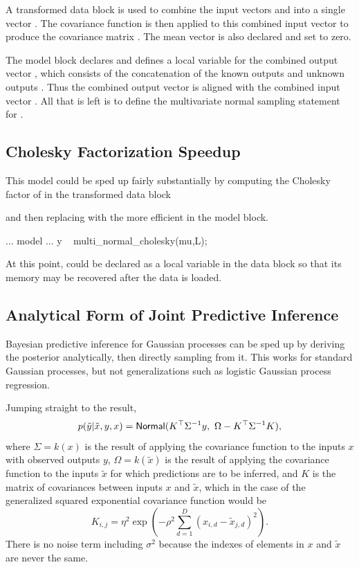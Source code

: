 A transformed data block is used to combine the input vectors
 and  into a single vector .  The covariance
function is then applied to this combined input vector to produce the
covariance matrix .  The mean vector  is also
declared and set to zero.

The model block declares and defines a local variable for the combined
output vector , which consists of the concatenation of the
known outputs  and unknown outputs .  Thus the
combined output vector  is aligned with the combined
input vector .  All that is left is to define the multivariate
normal sampling statement for .

\subsection{Cholesky Factorization Speedup}

This model could be sped up fairly substantially by computing the
Cholesky factor of  in the transformed data block
\begin{stancode}
transformed data {
  matrix[N1+N2, N1+N2] L;
...
  L = cholesky_decompose(Sigma);
...
\end{stancode}
%
and then replacing  with the more efficient
 in the model block.  
%
\begin{stancode}
...
model {
...
  y ~ multi_normal_cholesky(mu,L);
}
\end{stancode}
%  
At this point,  could be declared as a local
variable in the data block so that its memory may be recovered after
the data is loaded.

\subsection{Analytical Form of Joint Predictive Inference}

Bayesian predictive inference for Gaussian processes can be sped up by
deriving the posterior analytically, then directly sampling from it.
This works for standard Gaussian processes, but not
generalizations such as logistic Gaussian process regression.

Jumping straight to the result,
\[
p(\tilde{y}|\tilde{x},y,x)
= 
\distro{Normal}(K^{\top}\Sigma^{-1}y,\
                \Omega - K^{\top}\Sigma^{-1}K),
\]
where $\Sigma = k(x)$ is the result of applying the covariance
function to the inputs $x$ with observed outputs $y$, $\Omega =
k(\tilde{x})$ is the result of applying the covariance function to the
inputs $\tilde{x}$ for which predictions are to be inferred, and $K$
is the matrix of covariances between inputs $x$ and $\tilde{x}$, which
in the case of the generalized squared exponential covariance function
would be
\[
K_{i, j} = \eta^2 \exp(-\rho^2 \sum_{d=1}^D (x_{i,d} -
\tilde{x}_{j,d})^2).
\]
There is no noise term including $\sigma^2$ because the indexes of
elements in $x$ and $\tilde{x}$ are never the same.

